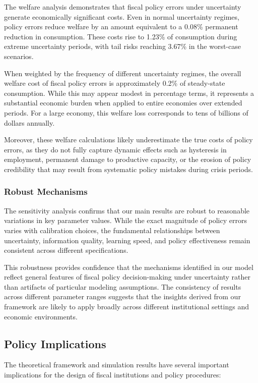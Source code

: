 \documentclass[5p,authoryear]{elsarticle}
\begin{document}
The welfare analysis demonstrates that fiscal policy errors under uncertainty generate economically significant costs. Even in normal uncertainty regimes, policy errors reduce welfare by an amount equivalent to a 0.08\% permanent reduction in consumption. These costs rise to 1.23\% of consumption during extreme uncertainty periods, with tail risks reaching 3.67\% in the worst-case scenarios.

When weighted by the frequency of different uncertainty regimes, the overall welfare cost of fiscal policy errors is approximately 0.2\% of steady-state consumption. While this may appear modest in percentage terms, it represents a substantial economic burden when applied to entire economies over extended periods. For a large economy, this welfare loss corresponds to tens of billions of dollars annually.

Moreover, these welfare calculations likely underestimate the true costs of policy errors, as they do not fully capture dynamic effects such as hysteresis in employment, permanent damage to productive capacity, or the erosion of policy credibility that may result from systematic policy mistakes during crisis periods.

\subsubsection{Robust Mechanisms}

The sensitivity analysis confirms that our main results are robust to reasonable variations in key parameter values. While the exact magnitude of policy errors varies with calibration choices, the fundamental relationships between uncertainty, information quality, learning speed, and policy effectiveness remain consistent across different specifications.

This robustness provides confidence that the mechanisms identified in our model reflect general features of fiscal policy decision-making under uncertainty rather than artifacts of particular modeling assumptions. The consistency of results across different parameter ranges suggests that the insights derived from our framework are likely to apply broadly across different institutional settings and economic environments.

\subsection{Policy Implications}

The theoretical framework and simulation results have several important implications for the design of fiscal institutions and policy procedures:
\end{document}
